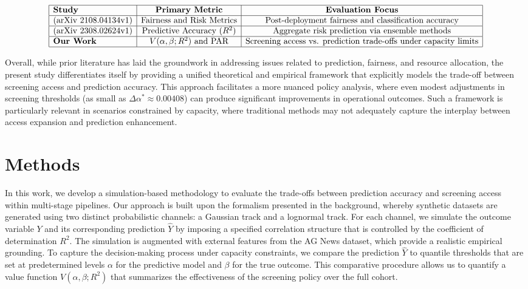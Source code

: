 \documentclass[11pt]{article}
\begin{document}
\[
\begin{array}{|l|c|c|}
\hline
\textbf{Study} & \textbf{Primary Metric} & \textbf{Evaluation Focus} \\
\hline
\text{(arXiv 2108.04134v1)} & \text{Fairness and Risk Metrics} & \text{Post-deployment fairness and classification accuracy} \\
\hline
\text{(arXiv 2308.02624v1)} & \text{Predictive Accuracy (}R^2\text{)} & \text{Aggregate risk prediction via ensemble methods} \\
\hline
\textbf{Our Work} & V(\alpha,\beta;R^2) \text{ and PAR} & \text{Screening access vs. prediction trade-offs under capacity limits} \\
\hline
\end{array}
\]

Overall, while prior literature has laid the groundwork in addressing issues related to prediction, fairness, and resource allocation, the present study differentiates itself by providing a unified theoretical and empirical framework that explicitly models the trade-off between screening access and prediction accuracy. This approach facilitates a more nuanced policy analysis, where even modest adjustments in screening thresholds (as small as \(\Delta \alpha^*\approx0.00408\)) can produce significant improvements in operational outcomes. Such a framework is particularly relevant in scenarios constrained by capacity, where traditional methods may not adequately capture the interplay between access expansion and prediction enhancement.

\section{Methods}
In this work, we develop a simulation-based methodology to evaluate the trade-offs between prediction accuracy and screening access within multi-stage pipelines. Our approach is built upon the formalism presented in the background, whereby synthetic datasets are generated using two distinct probabilistic channels: a Gaussian track and a lognormal track. For each channel, we simulate the outcome variable \(Y\) and its corresponding prediction \(\hat{Y}\) by imposing a specified correlation structure that is controlled by the coefficient of determination \(R^2\). The simulation is augmented with external features from the AG News dataset, which provide a realistic empirical grounding. To capture the decision-making process under capacity constraints, we compare the prediction \(\hat{Y}\) to quantile thresholds that are set at predetermined levels \(\alpha\) for the predictive model and \(\beta\) for the true outcome. This comparative procedure allows us to quantify a value function \(V(\alpha,\beta; R^2)\) that summarizes the effectiveness of the screening policy over the full cohort.
\end{document}
